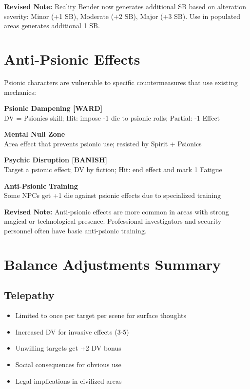 \documentclass[11pt,twoside]{article}
\begin{document}
\textbf{Revised Note:} Reality Bender now generates additional SB based on alteration severity: Minor (+1 SB), Moderate (+2 SB), Major (+3 SB). Use in populated areas generates additional 1 SB.

\section*{Anti-Psionic Effects}

Psionic characters are vulnerable to specific countermeasures that use existing mechanics:

\textbf{Psionic Dampening [WARD]} \\
DV = Psionics skill; Hit: impose -1 die to psionic rolls; Partial: -1 Effect

\textbf{Mental Null Zone} \\
Area effect that prevents psionic use; resisted by Spirit + Psionics

\textbf{Psychic Disruption [BANISH]} \\
Target a psionic effect; DV by fiction; Hit: end effect and mark 1 Fatigue

\textbf{Anti-Psionic Training} \\
Some NPCs get +1 die against psionic effects due to specialized training

\textbf{Revised Note:} Anti-psionic effects are more common in areas with strong magical or technological presence. Professional investigators and security personnel often have basic anti-psionic training.

\section*{Balance Adjustments Summary}

\subsection*{Telepathy}
\begin{itemize}[leftmargin=*]
    \item Limited to once per target per scene for surface thoughts
    \item Increased DV for invasive effects (3-5)
    \item Unwilling targets get +2 DV bonus
    \item Social consequences for obvious use
    \item Legal implications in civilized areas
\end{itemize}
\end{document}
